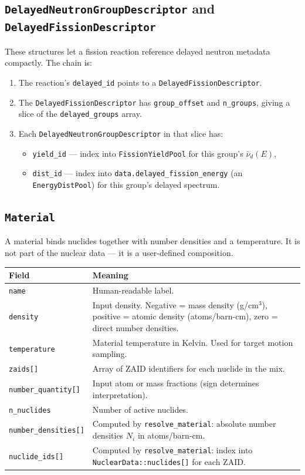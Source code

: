 \documentclass[11pt,a4paper]{article}
\begin{document}
\subsection{\texttt{DelayedNeutronGroupDescriptor} and \texttt{DelayedFissionDescriptor}}
These structures let a fission reaction reference delayed neutron metadata compactly. The chain is:
\begin{enumerate}[leftmargin=1.4em]
  \item The reaction's \texttt{delayed\_id} points to a \texttt{DelayedFissionDescriptor}.
  \item The \texttt{DelayedFissionDescriptor} has \texttt{group\_offset} and \texttt{n\_groups}, giving a slice of the \texttt{delayed\_groups} array.
  \item Each \texttt{DelayedNeutronGroupDescriptor} in that slice has:
  \begin{itemize}
    \item \texttt{yield\_id} --- index into \texttt{FissionYieldPool} for this group's $\bar\nu_d(E)$,
    \item \texttt{dist\_id} --- index into \texttt{data.delayed\_fission\_energy} (an \texttt{EnergyDistPool}) for this group's delayed spectrum.
  \end{itemize}
\end{enumerate}

\subsection{\texttt{Material}}
\label{sec:material}
A material binds nuclides together with number densities and a temperature. It is not part of the nuclear data --- it is a user-defined composition.

\begin{longtable}{p{3.5cm} p{8.8cm}}
\toprule
Field & Meaning \\
\midrule
\texttt{name} & Human-readable label. \\
\texttt{density} & Input density. Negative = mass density (g/cm$^3$), positive = atomic density (atoms/barn-cm), zero = direct number densities. \\
\texttt{temperature} & Material temperature in Kelvin. Used for target motion sampling. \\
\texttt{zaids[]} & Array of ZAID identifiers for each nuclide in the mix. \\
\texttt{number\_quantity[]} & Input atom or mass fractions (sign determines interpretation). \\
\texttt{n\_nuclides} & Number of active nuclides. \\
\texttt{number\_densities[]} & Computed by \texttt{resolve\_material}: absolute number densities $N_i$ in atoms/barn-cm. \\
\texttt{nuclide\_ids[]} & Computed by \texttt{resolve\_material}: index into \texttt{NuclearData::nuclides[]} for each ZAID. \\
\bottomrule
\end{longtable}
\end{document}
